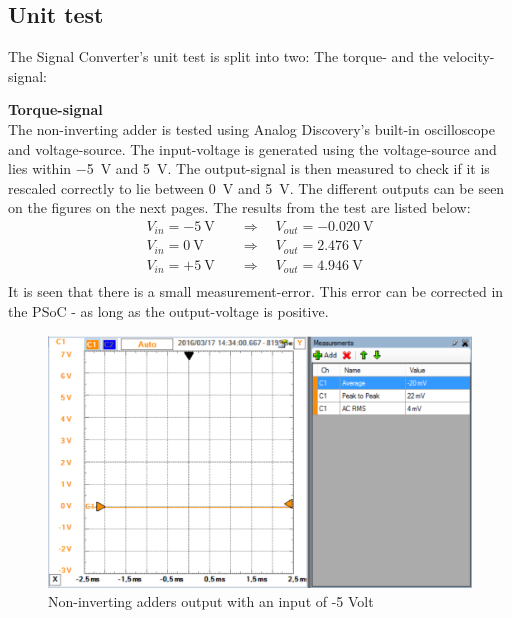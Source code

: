 \subsection{Unit test}
The Signal Converter's unit test is split into two: The torque- and the velocity-signal:

\textbf{Torque-signal}\\
The non-inverting adder is tested using Analog Discovery's built-in oscilloscope and voltage-source. The input-voltage is generated using the voltage-source and lies within \SI{-5}{\volt} and \SI{+5}{\volt}. The output-signal is then measured to check if it is rescaled correctly to lie between \SI{0}{\volt} and \SI{+5}{\volt}. The different outputs can be seen on the figures on the next pages. The results from the test are listed below:
\begin{equation}
	\begin{split}
		V_{in} = -\SI{5}{\volt} \quad &\Rightarrow \quad V_{out} = \SI{-0.020}{\volt}\\
		V_{in} = \SI{0}{\volt} \quad &\Rightarrow \quad V_{out} = \SI{2.476}{\volt}\\
		V_{in} = +\SI{5}{\volt} \quad &\Rightarrow \quad V_{out} = \SI{4.946}{\volt}\\
	\end{split}
\end{equation}
It is seen that there is a small measurement-error. This error can be corrected in the PSoC - as long as the output-voltage is positive.


\begin{figure}[H]
	\centering
	\includegraphics[width=0.9\linewidth]{Hardware/SignalConverter/Torque_test1}
	\caption{Non-inverting adders output with an input of -5 Volt}
	\label{fig:TorqueTest1}
\end{figure}


